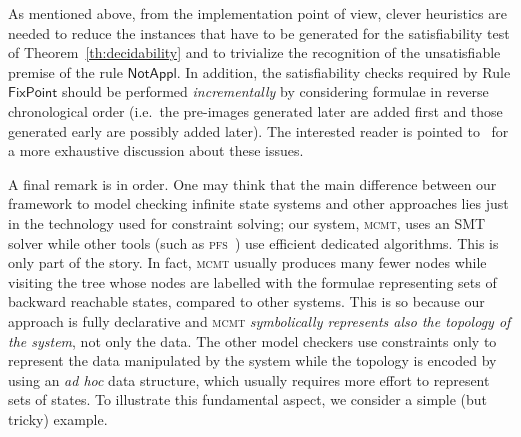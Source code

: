 \documentclass{LMCS}
\theoremstyle{plain}\newtheorem{assumption}[thm]{Assumption}
\theoremstyle{plain}\newtheorem{proposition}[thm]{Proposition}
\theoremstyle{plain}\newtheorem{property}[thm]{Property}
\theoremstyle{plain}\newtheorem{example}[thm]{Example}
\theoremstyle{plain}\newtheorem{claim}[thm]{Claim}
\theoremstyle{plain}\newtheorem{lemma}[thm]{Lemma}
\begin{document}
As mentioned above, from the implementation point of view, clever
heuristics are nee\-ded to reduce the instances that have to be
generated for the satisfiability test of Theorem~\ref{th:decidability}
and to trivialize the recognition of the unsatisfiable premise of the
rule $\mathsf{NotAppl}$.  In addition, the satisfiability checks
required by Rule $\mathsf{FixPoint}$ should be performed
\emph{incrementally} by considering formulae in reverse chronological
order (i.e.\ the pre-images generated later are added first and those
generated early are possibly added later).  The interested reader is
pointed to~\cite{afm09} for a more exhaustive discussion about these
issues.

A final remark is in order.  One may think that the main difference
between our framework to model checking infinite state systems and
other approaches lies just in the technology used for constraint
solving; our system, \textsc{mcmt}, uses an SMT solver while other
tools (such as \textsc{pfs}~\cite{tacas06}) use efficient dedicated
algorithms.
This is only part of the story.  In fact, \textsc{mcmt} usually
produces many fewer nodes while visiting the tree whose nodes are
labelled with the formulae representing sets of backward reachable
states, compared to other systems.  This is so because our approach is
fully declarative and \textsc{mcmt} \emph{symbolically represents also
  the topology of the system}, not only the data.  The other model
checkers use constraints only to represent the data manipulated by the
system while the topology is encoded by using an \emph{ad hoc} data
structure, which usually requires more effort to represent sets of
states.  To illustrate this fundamental aspect, we consider a simple
(but tricky) example.
\end{document}

